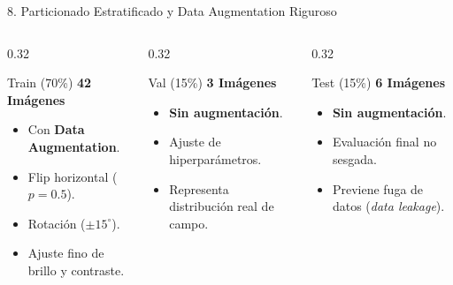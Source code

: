 \documentclass[aspectratio=169,10pt]{beamer}
\begin{document}
\begin{frame}{8. Particionado Estratificado y Data Augmentation Riguroso}
    \begin{columns}[T]
        \begin{column}{0.32\textwidth}
            \begin{block}{\centering Train (70\%)}
                \centering \Large \textbf{42 Imágenes}
                \vspace{0.2cm}
                \normalsize
                \begin{itemize}
                    \item Con \textbf{Data Augmentation}.
                    \item Flip horizontal ($p=0.5$).
                    \item Rotación ($\pm 15^\circ$).
                    \item Ajuste fino de brillo y contraste.
                \end{itemize}
            \end{block}
        \end{column}
        
        \begin{column}{0.32\textwidth}
            \begin{exampleblock}{\centering Val (15\%)}
                \centering \Large \textbf{3 Imágenes}
                \vspace{0.2cm}
                \normalsize
                \begin{itemize}
                    \item \textbf{Sin augmentación}.
                    \item Ajuste de hiperparámetros.
                    \item Representa distribución real de campo.
                \end{itemize}
            \end{exampleblock}
        \end{column}
        
        \begin{column}{0.32\textwidth}
            \begin{alertblock}{\centering Test (15\%)}
                \centering \Large \textbf{6 Imágenes}
                \vspace{0.2cm}
                \normalsize
                \begin{itemize}
                    \item \textbf{Sin augmentación}.
                    \item Evaluación final no sesgada.
                    \item Previene fuga de datos (\textit{data leakage}).
                \end{itemize}
            \end{alertblock}
        \end{column}
    \end{columns}
\end{frame}
\end{document}

